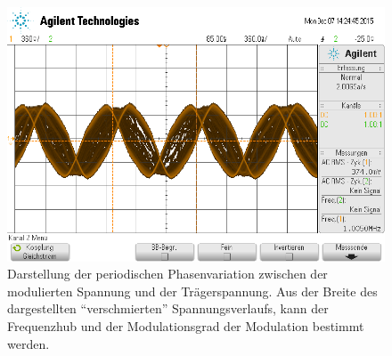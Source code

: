 \FloatBarrier
\begin{figure}[!h]
	\centering
	\includegraphics[scale=0.50]{../Grafiken/Messung_d2.png}
	\caption{Darstellung der periodischen Phasenvariation zwischen der modulierten Spannung und der
	Trägerspannung. Aus der Breite des dargestellten \enquote{verschmierten} Spannungsverlaufs, kann der Frequenzhub
	und der Modulationsgrad der Modulation bestimmt werden. \label{fig:frequenz_modulation_d_phasenvariation}}
\end{figure}
\FloatBarrier
